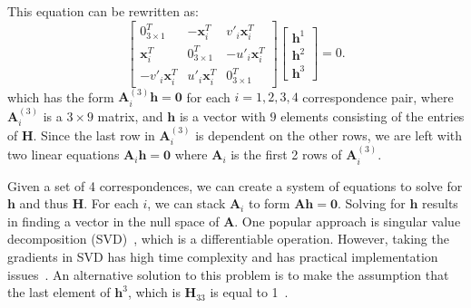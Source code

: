 \documentclass[letterpaper, 10 pt, conference]{ieeeconf}
\newcommand{\bx}{\mathbf{x}}
\newcommand{\bH}{\mathbf{H}}
\begin{document}
This equation can be rewritten as: 
\begin{equation}
               \begin{bmatrix}
         0_{3\times 1}^T     &  -\bx_i^T             &  v'_i \bx_i^T \\ 
               \bx_i^T             &    0_{3\times 1}^T    & -u'_i\bx_i^T \\        
               - v'_i\bx_i^T       &  u'_i \bx_i^T         &    0_{3\times 1}^T 
           \end{bmatrix}
               \begin{bmatrix}
         \mathbf{h}^1  \\ 
                 \mathbf{h}^2  \\ 
                 \mathbf{h}^3  
      \end{bmatrix}  = 0. 
\label{eq:3_9}
\end{equation}
which has the form $\mathbf{A}^{(3)}_i \mathbf{h} = \mathbf{0}$ for each $i=1,2,3,4$ correspondence pair, where $\mathbf{A}^{(3)}_i$ is a $3 \times 9$ matrix, and $\mathbf{h}$ is a vector with $9$ elements consisting of the entries of $\bH$. Since the last row in $\mathbf{A}^{(3)}_{i}$ is dependent on the other rows, we are left with two linear equations $\mathbf{A}_i \mathbf{h} = \mathbf{0}$ where $\mathbf{A}_i$ is the first 2 rows of $\mathbf{A}^{(3)}_i$.

Given a set of 4 correspondences, we can create a system of equations to solve for $\mathbf{h}$ and thus $\bH$. For each $i$, we can stack $\mathbf{A}_i$ to form $\mathbf{A} \mathbf{h} = \mathbf{0}$. Solving for $\mathbf{h}$ results in finding a vector in the null space of $\mathbf{A}$. One popular approach is singular value decomposition (SVD)~\cite{golub1970singular}, which is a differentiable operation. However, taking the gradients in SVD has high time complexity and has practical implementation issues~\cite{papadopoulo2000estimating}. An alternative solution to this problem is to make the assumption that the last element of $\mathbf{h}^{3}$, which is $\bH_{33}$ is equal to 1~\cite{hartley2003multiple}.  
\end{document}
